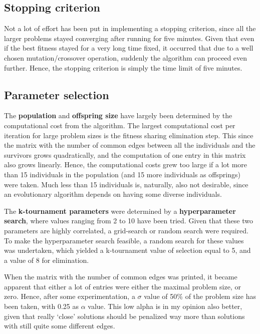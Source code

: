 \documentclass[a4paper,10pt]{article}
\newcommand{\ReplaceMe}[1]{{\color{blue}#1}}
\begin{document}
\subsection{Stopping criterion}
Not a lot of effort has been put in implementing a stopping criterion, since all the larger problems stayed converging after running for five minutes. Given that even if the best fitness stayed for a very long time fixed, it occurred that due to a well chosen mutation/crossover operation, suddenly the algorithm can proceed even further. Hence, the stopping criterion is simply the time limit of five minutes.


\subsection{Parameter selection}
\label{parameter_selection}
The \textbf{population} and \textbf{offspring size} have largely been determined by the computational cost from the algorithm. The largest computational cost per iteration for large problem sizes is the fitness sharing elimination step. This since the matrix with the number of common edges between all the individuals and the survivors grows quadratically, and the computation of one entry in this matrix also grows linearly. Hence, the computational costs grew too large if a lot more than 15 individuals in the population (and 15 more individuals as offsprings) were taken. Much less than 15 individuals is, naturally, also not desirable, since an evolutionary algorithm depends on having some diverse individuals.

The \textbf{k-tournament parameters} were determined by a \textbf{hyperparameter search}, where values ranging from 2 to 10 have been tried. Given that these two parameters are highly correlated, a grid-search or random search were required. To make the hyperparameter search feasible, a random search for these values was undertaken, which yielded a k-tournament value of selection equal to 5, and a value of 8 for elimination.

When the matrix with the number of common edges was printed, it became apparent that either a lot of entries were either the maximal problem size, or zero. Hence, after some experimentation, a $\sigma$ value of 50\% of the problem size has been taken, with 0.25 as $\alpha$ value. This low alpha is in my opinion also better, given that really `close' solutions should be penalized way more than solutions with still quite some different edges.
\end{document}
